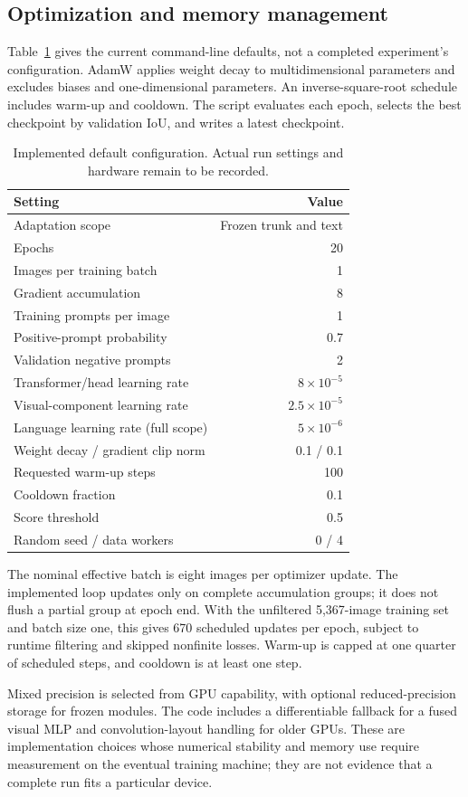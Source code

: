 \subsection{Optimization and memory management}
Table~\ref{tab:settings} gives the current command-line defaults, not a completed experiment's configuration. AdamW applies weight decay to multidimensional parameters and excludes biases and one-dimensional parameters. An inverse-square-root schedule includes warm-up and cooldown. The script evaluates each epoch, selects the best checkpoint by validation IoU, and writes a latest checkpoint.

\begin{table}[t]
\centering\small
\caption{Implemented default configuration. Actual run settings and hardware remain to be recorded.}
\label{tab:settings}
\begin{tabular}{lr}\toprule
Setting & Value\\\midrule
Adaptation scope & Frozen trunk and text\\
Epochs & 20\\
Images per training batch & 1\\
Gradient accumulation & 8\\
Training prompts per image & 1\\
Positive-prompt probability & 0.7\\
Validation negative prompts & 2\\
Transformer/head learning rate & $8\times10^{-5}$\\
Visual-component learning rate & $2.5\times10^{-5}$\\
Language learning rate (full scope) & $5\times10^{-6}$\\
Weight decay / gradient clip norm & 0.1 / 0.1\\
Requested warm-up steps & 100\\
Cooldown fraction & 0.1\\
Score threshold & 0.5\\
Random seed / data workers & 0 / 4\\\bottomrule
\end{tabular}
\end{table}

The nominal effective batch is eight images per optimizer update. The implemented loop updates only on complete accumulation groups; it does not flush a partial group at epoch end. With the unfiltered 5,367-image training set and batch size one, this gives 670 scheduled updates per epoch, subject to runtime filtering and skipped nonfinite losses. Warm-up is capped at one quarter of scheduled steps, and cooldown is at least one step.

Mixed precision is selected from GPU capability, with optional reduced-precision storage for frozen modules. The code includes a differentiable fallback for a fused visual MLP and convolution-layout handling for older GPUs. These are implementation choices whose numerical stability and memory use require measurement on the eventual training machine; they are not evidence that a complete run fits a particular device.
